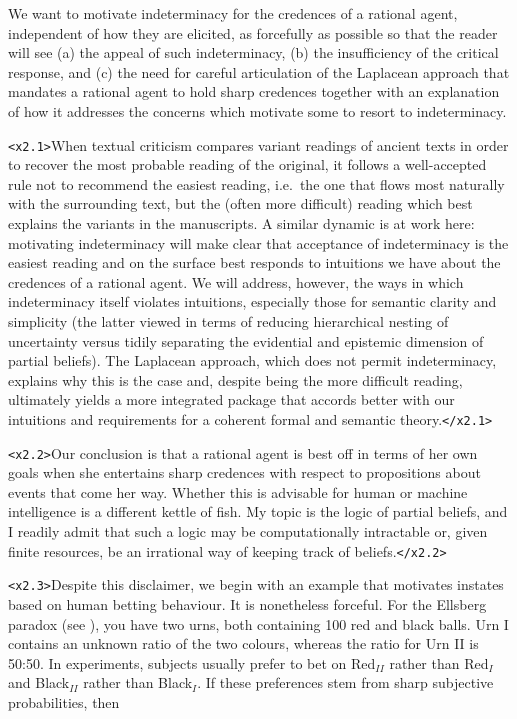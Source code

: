 \documentclass[11pt]{article}
\begin{document}
We want to motivate indeterminacy for the credences of a rational agent, independent of how they are elicited, as forcefully as possible so that the reader will see (a) the appeal of such indeterminacy, (b) the insufficiency of the critical response, and (c) the need for careful articulation of the Laplacean approach that mandates a rational agent to hold sharp credences together with an explanation of how it addresses the concerns which motivate some to resort to indeterminacy.

\texttt{<x2.1>}When textual criticism compares variant readings of ancient texts in order to recover the most probable reading of the original, it follows a well-accepted rule not to recommend the easiest reading, i.e.\ the one that flows most naturally with the surrounding text, but the (often more difficult) reading which best explains the variants in the manuscripts. A similar dynamic is at work here: motivating indeterminacy will make clear that acceptance of indeterminacy is the easiest reading and on the surface best responds to intuitions we have about the credences of a rational agent. We will address, however, the ways in which indeterminacy itself violates intuitions, especially those for semantic clarity and simplicity (the latter viewed in terms of reducing hierarchical nesting of uncertainty versus tidily separating the evidential and epistemic dimension of partial beliefs). The Laplacean approach, which does not permit indeterminacy, explains why this is the case and, despite being the more difficult reading, ultimately yields a more integrated package that accords better with our intuitions and requirements for a coherent formal and semantic theory.\texttt{</x2.1>}

\texttt{<x2.2>}Our conclusion is that a rational agent is best off in terms of her own goals when she entertains sharp credences with respect to propositions about events that come her way. Whether this is advisable for human or machine intelligence is a different kettle of fish. My topic is the logic of partial beliefs, and I readily admit that such a logic may be computationally intractable or, given finite resources, be an irrational way of keeping track of beliefs.\texttt{</x2.2>}

\texttt{<x2.3>}Despite this disclaimer, we begin with an example that motivates instates based on human betting behaviour. It is nonetheless forceful. For the Ellsberg paradox (see ), you have two urns, both containing 100 red and black balls. Urn I contains an unknown ratio of the two colours, whereas the ratio for Urn II is 50:50. In experiments, subjects usually prefer to bet on Red$_{II}$ rather than Red$_{I}$ and Black$_{II}$ rather than Black$_{I}$. If these preferences stem from sharp subjective probabilities, then
\end{document}
